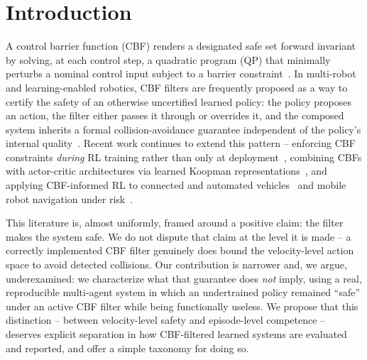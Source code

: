 \documentclass[12pt]{article}
\begin{document}
\section{Introduction}
A control barrier function (CBF) renders a designated safe set forward
invariant by solving, at each control step, a quadratic program (QP) that
minimally perturbs a nominal control input subject to a barrier
constraint~\cite{ames2019cbf}. In multi-robot and learning-enabled robotics,
CBF filters are frequently proposed as a way to certify the safety of an
otherwise uncertified learned policy: the policy proposes an action, the
filter either passes it through or overrides it, and the composed system
inherits a formal collision-avoidance guarantee independent of the policy's
internal quality~\cite{cheng2019end}. Recent work continues to extend this
pattern -- enforcing CBF constraints \emph{during} RL training rather than
only at
deployment~\cite{cbfrl2025}, combining CBFs with actor-critic architectures
via learned Koopman
representations~\cite{koopmancbf2026}, and applying CBF-informed RL to
connected and automated vehicles~\cite{beyondsafety2026} and mobile robot
navigation under
risk~\cite{riskaware2026}.

This literature is, almost uniformly, framed around a positive claim: the
filter makes the system safe. We do not dispute that claim at the level it is
made -- a correctly implemented CBF filter genuinely does bound the
velocity-level action space to avoid detected collisions. Our contribution is
narrower and, we argue, underexamined: we characterize what that guarantee
does \emph{not} imply, using a real, reproducible multi-agent system in which
an undertrained policy remained ``safe'' under an active CBF filter while
being functionally useless. We propose that this distinction -- between
velocity-level safety and episode-level competence -- deserves explicit
separation in how CBF-filtered learned systems are evaluated and reported,
and offer a simple taxonomy for doing so.
\end{document}

